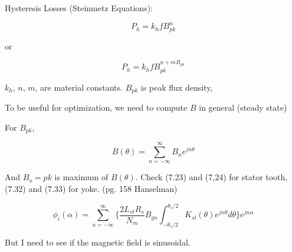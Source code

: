 \documentclass[10pt]{article}
\begin{document}
Hysteresis Losses (Steinmetz Equations):

\begin{equation}
P_h = k_hfB_{pk}^n
\end{equation}

or 

\begin{equation}
P_h = k_hfB_{pk}^{n+mB_{pk}}
\end{equation}

$k_h$, $n$, $m$, are material constants. $B_{pk}$ is peak flux density,

To be useful for optimization, we need to compute $B$ in general (steady state)

For $B_{pk}$,

\begin{equation}
B(\theta) = \sum_{n=-\infty}^{\infty}B_ne^{jn\theta}
\end{equation}

And $B_o={pk}$ is maximum of $B(\theta)$. Check (7.23) and (7,24) for stator tooth, (7.32) and (7.33) for yoke. (pg. 158 Hanselman)

\begin{equation}
\phi_i(\alpha) = \sum_{n=-\infty}^{\infty}\bigg\{\frac{2L_{st}R_s}{N_m}B_{gn}\int_{-\theta_s/2}^{\theta_s/2}K_{sl}(\theta)e^{jn\theta}d\theta{}\bigg\}e^{jn\alpha}
\end{equation}

But I need to see if the magnetic field is sinusoidal.
\end{document}
